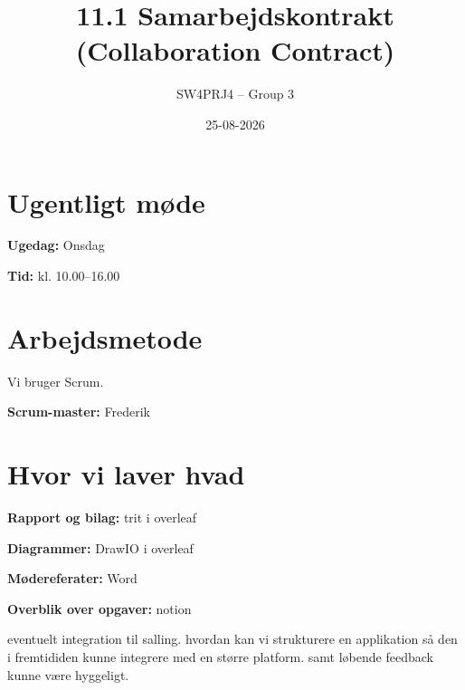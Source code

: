 \documentclass[a4paper,11pt]{article}
\title{11.1 Samarbejdskontrakt (Collaboration Contract)}
\author{SW4PRJ4 -- Group 3}
\date{25-08-2026}
\begin{document}
\maketitle

\section{Ugentligt møde}

\textbf{Ugedag:} Onsdag

\textbf{Tid:} kl. 10.00--16.00

\section{Arbejdsmetode}

Vi bruger Scrum.

\textbf{Scrum-master:} Frederik

\section{Hvor vi laver hvad}

\textbf{Rapport og bilag:} trit i overleaf

\textbf{Diagrammer:} DrawIO i overleaf

\textbf{Mødereferater:} Word

\textbf{Overblik over opgaver:} notion


eventuelt integration til salling. hvordan kan vi strukturere en applikation så den i fremtididen kunne integrere med en større platform. samt løbende feedback kunne være hyggeligt.
\end{document}

